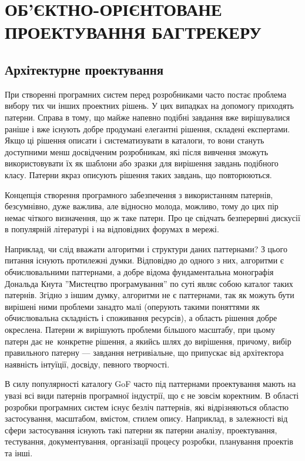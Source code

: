 \documentclass[../main.tex]{subfiles}
\begin{document}
\chapter{ОБ’ЄКТНО-ОРІЄНТОВАНЕ ПРОЕКТУВАННЯ БАГТРЕКЕРУ}

\section{Архітектурне проектування}

При створенні програмних систем перед розробниками часто постає проблема вибору тих чи інших проектних рішень. У цих випадках на допомогу приходять патерни. Справа в тому, що майже напевно подібні завдання вже вирішувалися раніше і вже існують добре продумані елегантні рішення, складені експертами. Якщо ці рішення описати і систематизувати в каталоги, то вони стануть доступними менш досвідченим розробникам, які після вивчення зможуть використовувати їх як шаблони або зразки для вирішення завдань подібного класу. Патерни якраз описують рішення таких завдань, що повторюються.~\cite{uml_patterns}

Концепція створення програмного забезпечення з використанням патернів, безсумнівно, дуже важлива, але відносно молода, можливо, тому до цих пір немає чіткого визначення, що ж таке патерн. Про це свідчать безперервні дискусії в популярній літературі і на відповідних форумах в мережі.

Наприклад, чи слід вважати алгоритми і структури даних паттернами? З цього питання існують протилежні думки. Відповідно до одного з них, алгоритми є обчислювальними паттернами, а добре відома фундаментальна монографія Дональда Кнута ''Мистецтво програмування'' по суті являє собою каталог таких патернів. Згідно з іншим думку, алгоритми не є паттернами, так як можуть бути вирішені ними проблеми занадто малі (оперують такими поняттями як обчислювальна складність і споживання ресурсів), а область рішення добре окреслена. Патерни ж вирішують проблеми більшого масштабу, при цьому патерн дає не~конкретне рішення, а якийсь шлях до вирішення, причому, вибір правильного патерну — завдання нетривіальне, що припускає від архітектора наявність інтуїції, досвіду, певного творчості.~\cite{design_patterns}

В силу популярності каталогу GoF \cite{gof} часто під паттернами проектування мають на увазі всі види патернів програмної індустрії, що є не зовсім коректним. В області розробки програмних систем існує безліч паттернів, які відрізняються областю застосування, масштабом, вмістом, стилем опису. Наприклад, в залежності від сфери застосування існують такі патерни як патерни аналізу, проектування, тестування, документування, організації процесу розробки, планування проектів та інші.~\cite{elemental_design_patterns}
\end{document}

